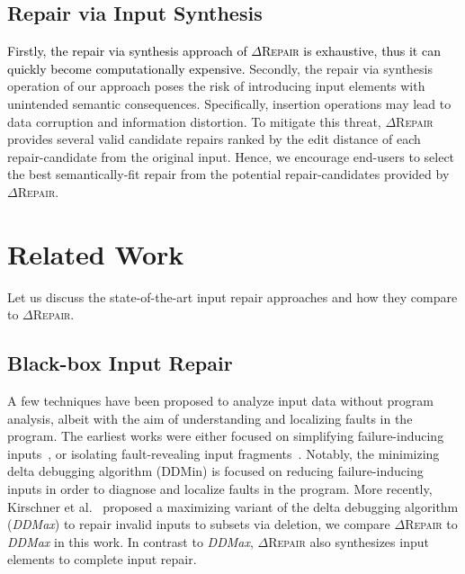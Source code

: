 \documentclass[acmsmall,screen,review,anonymous]{acmart}
\newcounter{todocounter}
\newcommand{\done}[1]{\marginpar{$*$}\textcolor{green}{\stepcounter{todocounter}\footnote[\thetodocounter]{\textcolor{black}{\textbf{DONE }}\textit{#1}}}}
\newcommand{\revise}[1]{\textcolor{black}{#1}}
\renewcommand{\done}[1]{} %
\renewcommand{\done}[1]{}
\newcommand{\ddmin}{\textit{ddmin}\xspace}
\newcommand{\approach}{\textsc{$\Delta$Repair}\xspace}
\def\ddmin{DDMin\xspace}
\newcommand{\ddmax}{\textit{DDMax}\xspace}
\begin{document}
\subsection{Repair via Input Synthesis} 
\revise{Firstly, the repair via synthesis approach of \approach is exhaustive, thus it can quickly become computationally expensive.} 
Secondly, the repair via synthesis operation %
of our approach poses the risk of introducing input elements with unintended semantic consequences. 
Specifically, insertion operations may lead %
to data corruption and information distortion. To mitigate this threat, \approach provides several valid candidate repairs ranked by the edit distance 
of each repair-candidate from the original input. %
Hence, we 
encourage end-users to select the best semantically-fit repair from the 
potential repair-candidates provided by \approach. 


\done{Do you talk about the risk of input synthesis (which may be perceived as greater than the risk of input deletion) somewhere? A small lexical change may have large semantical consequences -- AZ}






\section{Related Work}
\label{sec:relatedwork}

Let us discuss the state-of-the-art input repair approaches and how they compare to \approach. 

\subsection{Black-box Input Repair} 
A few techniques have been proposed to analyze input data without program analysis, albeit with the aim of understanding and localizing faults in the program. The earliest works were either focused on simplifying failure-inducing inputs~\cite{zeller2002simplifying, clause2009penumbra}, or isolating fault-revealing input fragments~\cite{hierarchicalDD, sterling2007automated}. Notably, the minimizing delta debugging algorithm (\ddmin) is focused on reducing failure-inducing inputs in order to diagnose and localize faults in the program. More recently, Kirschner et al.~\cite{kirschner2020debugging} proposed a maximizing variant of the delta debugging algorithm (\ddmax) to repair invalid inputs to subsets via deletion, we compare \approach to \ddmax in this work. In contrast to \ddmax, \approach also synthesizes input elements to complete input repair. 
\end{document}
